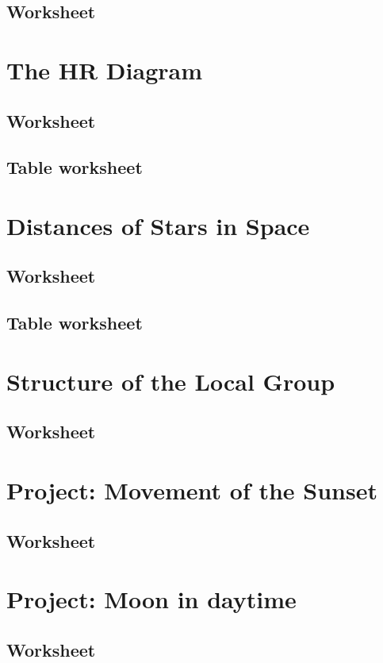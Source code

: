 \documentclass[12pt]{article}
\begin{document}
\subsection{Worksheet}\label{apx:lab_08_ws}


\newpage
\section{The HR Diagram}\label{apx:lab_09}
\subsection{Worksheet}\label{apx:lab_09_ws}


\newpage
\subsection{Table worksheet}\label{apx:lab_09_tb}


\newpage
\section{Distances of Stars in Space}\label{apx:lab_10}
\subsection{Worksheet}\label{apx:lab_10_ws}


\newpage
\subsection{Table worksheet}\label{apx:lab_10_tb}


\newpage
\section{Structure of the Local Group}\label{apx:lab_11}
\subsection{Worksheet}\label{apx:lab_11_ws}


\newpage
\section{Project: Movement of the Sunset}\label{apx:pro_1}
\subsection{Worksheet}\label{apx:pro_1_ws}


\newpage
\section{Project: Moon in daytime}\label{apx:pro_2}
\subsection{Worksheet}\label{apx:pro_2_ws}

\end{document}
